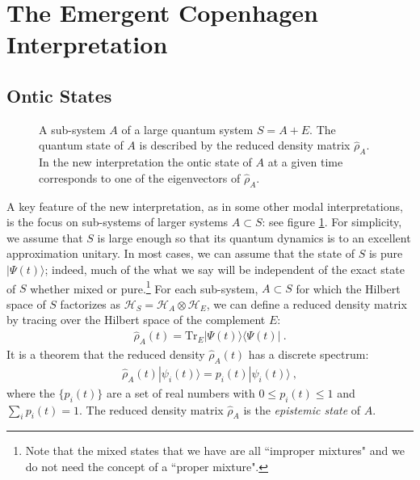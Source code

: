 \documentclass[%
preprint,
nofootinbib,
 amsmath,amssymb,
aps,
]{revtex4-1}
\def\BS{S}
\def\BA{A}
\def\BH{{\mathscr H}}
\newcommand{\Tr}{\operatorname{Tr}}
\def\bra#1{\langle #1|}
\def\ket#1{| #1\rangle}
\newcommand{\EQ}[1]{\begin{equation}\begin{split} #1
\end{split}\end{equation}}
\begin{document}
\section{The Emergent Copenhagen Interpretation }\label{s1.1}

\subsection{Ontic States}\label{s1.11}

\begin{figure}[t]
\begin{center}
\end{center}
\caption{\small A sub-system $A$ of a large quantum system $S=A+E$. The quantum state of $A$ is described by the reduced density matrix $\hat\rho_A$. In the new interpretation the ontic state of $A$ at a given time corresponds to one of the eigenvectors of $\hat\rho_A$.}
\label{f1}
\end{figure}

A key feature of the new interpretation, as in some other modal interpretations, is the focus on sub-systems of larger systems 
$\BA\subset\BS$: see figure \ref{f1}.
For simplicity, we assume that $S$ is large enough so that its quantum dynamics is to an excellent approximation unitary. In most cases, we can assume that the state of $S$ is pure $\ket{\Psi(t)}$; indeed, much of the 
what we say will be independent of the exact state of $S$ whether mixed or pure.\footnote{Note that the mixed states that we have are all ``improper mixtures" and we do not need the concept of a ``proper mixture".}
For each sub-system, $\BA\subset\BS$ for which the Hilbert space of $\BS$ factorizes as $\BH_\BS=\BH_\BA\otimes\BH_E$, we can define a reduced density matrix by tracing over the Hilbert space of the complement $E$:
\EQ{
\hat\rho_A(t)=\text{Tr}_E\ket{\Psi(t)}\bra{\Psi(t)}\ .
}
It is a theorem that the reduced density $\hat\rho_A(t)$ has a discrete spectrum:
\EQ{
\hat\rho_A(t)\ket{\psi_i(t)}=p_i(t)\ket{\psi_i(t)}\ ,
\label{pdx}
}
where the $\{p_i(t)\}$ are a set of real numbers with $0\leq p_i(t)\leq1$ and $\sum_ip_i(t)=1$. The reduced density matrix $\hat\rho_A$ is the {\it epistemic state\/} of $A$.
\end{document}
